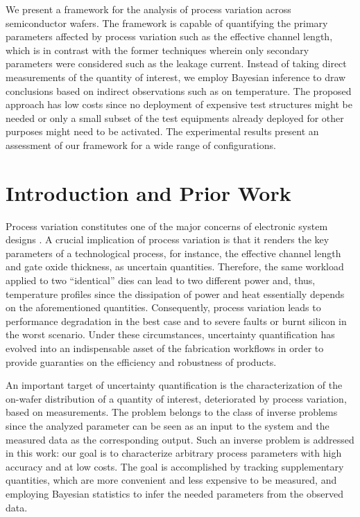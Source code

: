 We present a framework for the analysis of process variation across
semiconductor wafers. The framework is capable of quantifying the primary
parameters affected by process variation such as the effective channel length,
which is in contrast with the former techniques wherein only secondary
parameters were considered such as the leakage current. Instead of taking direct
measurements of the quantity of interest, we employ Bayesian inference to draw
conclusions based on indirect observations such as on temperature. The proposed
approach has low costs since no deployment of expensive test structures might be
needed or only a small subset of the test equipments already deployed for other
purposes might need to be activated. The experimental results present an
assessment of our framework for a wide range of configurations.

\section{Introduction and Prior Work}

Process variation constitutes one of the major concerns of electronic system
designs \cite{chandrakasan2000, srivastava2010}. A crucial implication of
process variation is that it renders the key parameters of a technological
process, for instance, the effective channel length and gate oxide thickness, as
uncertain quantities. Therefore, the same workload applied to two ``identical''
dies can lead to two different power and, thus, temperature profiles since the
dissipation of power and heat essentially depends on the aforementioned
quantities. Consequently, process variation leads to performance degradation in
the best case and to severe faults or burnt silicon in the worst scenario. Under
these circumstances, uncertainty quantification has evolved into an
indispensable asset of the fabrication workflows in order to provide guaranties
on the efficiency and robustness of products.

An important target of uncertainty quantification is the characterization of the
on-wafer distribution of a quantity of interest, deteriorated by process
variation, based on measurements. The problem belongs to the class of inverse
problems since the analyzed parameter can be seen as an input to the system and
the measured data as the corresponding output. Such an inverse problem is
addressed in this work: our goal is to characterize arbitrary process parameters
with high accuracy and at low costs. The goal is accomplished by tracking
supplementary quantities, which are more convenient and less expensive to be
measured, and employing Bayesian statistics \cite{gelman2004} to infer the
needed parameters from the observed data.

